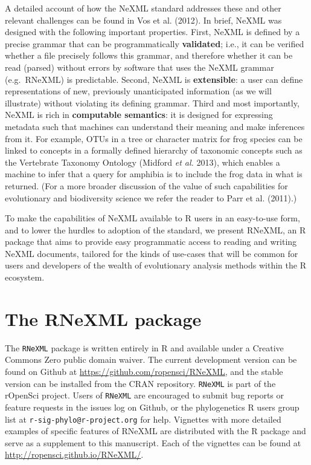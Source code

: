 \documentclass[author-year, review, 11pt]{elsarticle} %
\begin{document}
A detailed account of how the NeXML standard addresses these and other
relevant challenges can be found in Vos et al. (2012). In brief, NeXML
was designed with the following important properties. First, NeXML is
defined by a precise grammar that can be programmatically
\textbf{validated}; i.e., it can be verified whether a file precisely
follows this grammar, and therefore whether it can be read (parsed)
without errors by software that uses the NeXML grammar (e.g.~RNeXML) is
predictable. Second, NeXML is \textbf{extensible}: a user can define
representations of new, previously unanticipated information (as we will
illustrate) without violating its defining grammar. Third and most
importantly, NeXML is rich in \textbf{computable semantics}: it is
designed for expressing metadata such that machines can understand their
meaning and make inferences from it. For example, OTUs in a tree or
character matrix for frog species can be linked to concepts in a
formally defined hierarchy of taxonomic concepts such as the Vertebrate
Taxonomy Ontology (Midford \emph{et al.} 2013), which enables a machine
to infer that a query for amphibia is to include the frog data in what
is returned. (For a more broader discussion of the value of such
capabilities for evolutionary and biodiversity science we refer the
reader to Parr et al. (2011).)

To make the capabilities of NeXML available to R users in an easy-to-use
form, and to lower the hurdles to adoption of the standard, we present
RNeXML, an R package that aims to provide easy programmatic access to
reading and writing NeXML documents, tailored for the kinds of use-cases
that will be common for users and developers of the wealth of
evolutionary analysis methods within the R ecosystem.

\section{The RNeXML package}\label{the-rnexml-package}

The \texttt{RNeXML} package is written entirely in R and available under
a Creative Commons Zero public domain waiver. The current development
version can be found on Github at
\href{}{\url{https://github.com/ropensci/RNeXML}}, and the stable
version can be installed from the CRAN repository. \texttt{RNeXML} is
part of the rOpenSci project. Users of \texttt{RNeXML} are encouraged to
submit bug reports or feature requests in the issues log on Github, or
the phylogenetics R users group list at
\texttt{r-sig-phylo@r-project.org} for help. Vignettes with more
detailed examples of specific features of RNeXML are distributed with
the R package and serve as a supplement to this manuscript. Each of the
vignettes can be found at
\href{}{\url{http://ropensci.github.io/RNeXML/}}.
\end{document}
